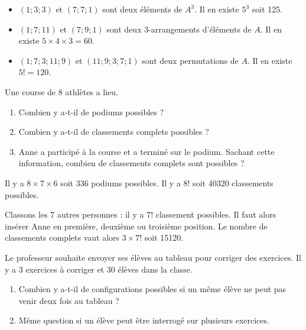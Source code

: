 \documentclass[11pt,fleqn, openany]{book} %
\begin{document}
\begin{solution}\hspace{0pt}
\vspace{-0.5cm}
\begin{itemize}
\item $(1;3;3)$ et $(7;7;1)$ sont deux éléments de $A^3$. Il en existe $5^3$ soit 125.
\item $(1;7;11)$ et $(7;9;1)$ sont deux 3-arrangements d'éléments de $A$. Il en existe $5 \times 4 \times 3 = 60$.
\item $(1;7;3;11;9)$ et $(11;9;3;7;1)$ sont deux permutations de $A$. Il en existe $5!=120$.
\end{itemize}\end{solution}



\begin{exercise}[topic=comb02]Une course de 8 athlètes a lieu. 
\begin{enumerate}
\item Combien y a-t-il de podiums possibles ? 
\item Combien y a-t-il de classements complets possibles ?
\item Anne a participé à la course et a terminé sur le podium. Sachant cette information, combien de classements complets sont possibles ?
\end{enumerate}\newpage \end{exercise}

\begin{solution}Il y a $8 \times 7 \times 6$ soit 336 podiums possibles. Il y a $8!$ soit 40320 classements possibles.

Classons les 7 autres personnes : il y a 7! classement possibles. Il faut alors insérer Anne en première, deuxième ou troisième position. Le nombre de classements complets vaut alors $3 \times 7!$ soit 15120.\end{solution}




\begin{exercise}[topic=comb02]Le professeur souhaite envoyer ses élèves au tableau pour corriger des exercices. Il y a 3 exercices à corriger et 30 élèves dans la classe.
\begin{enumerate}
\item Combien y a-t-il de configurations possibles si un même élève ne peut pas venir deux fois au tableau ?
\item Même question si un élève peut être interrogé sur plusieurs exercices.
\end{enumerate}\end{exercise}
\end{document}
